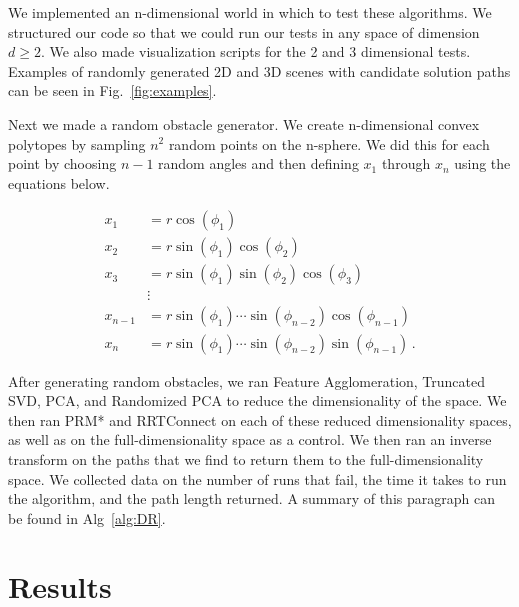 \documentclass[12pt]{article}
\begin{document}
We implemented an n-dimensional world in which to test these algorithms. We
structured our code so that we could run our tests in any space of dimension $d
\geq 2$. We also made visualization scripts for the 2 and 3 dimensional tests.
Examples of randomly generated 2D and 3D scenes with candidate solution paths
can be seen in Fig.~\ref{fig:examples}.

Next we made a random obstacle generator. We create n-dimensional convex
polytopes by sampling $n^{2}$ random points on the n-sphere. We did this for
each point by choosing $n-1$ random angles and then defining $x_1$ through
$x_n$ using the equations below.

\begin{align*}
x_1 &= r \cos(\phi_1) \\
x_2 &= r \sin(\phi_1) \cos(\phi_2) \\
x_3 &= r \sin(\phi_1) \sin(\phi_2) \cos(\phi_3) \\
    &\vdots\\
x_{n-1} &= r \sin(\phi_1) \cdots \sin(\phi_{n-2}) \cos(\phi_{n-1}) \\
x_n &= r \sin(\phi_1) \cdots \sin(\phi_{n-2}) \sin(\phi_{n-1}) \,.
\end{align*}

After generating random obstacles, we ran Feature Agglomeration, Truncated SVD,
PCA, and Randomized PCA to reduce the dimensionality of the space. We then ran
PRM* and RRTConnect on each of these reduced dimensionality spaces, as well as
on the full-dimensionality space as a control. We then ran an inverse transform
on the paths that we find to return them to the full-dimensionality space. We
collected data on the number of runs that fail, the time it takes to run the
algorithm, and the path length returned. A summary of this paragraph can be
found in Alg~\ref{alg:DR}. 

\section{Results}
\end{document}
